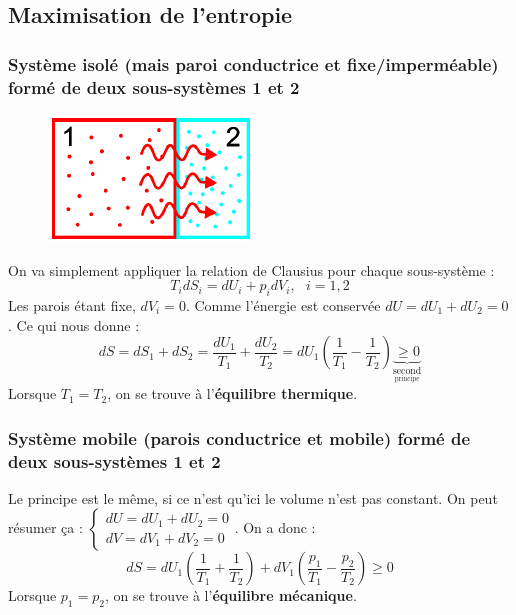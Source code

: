 \documentclass[11pt, a4paper, openany]{book}
\begin{document}
		\subsection{Maximisation de l'entropie}
		\subsubsection{Système isolé (mais paroi conductrice et fixe/imperméable) formé de deux sous-systèmes 1  et 2}
		\begin{figure}
			\includegraphics[scale=0.5]{cp/image3.png}
		\end{figure}
		On va simplement appliquer la relation de Clausius pour chaque sous-système :
		\begin{equation}
			T_idS_i = dU_i + p_idV_i, \ \ \ i= 1,2
		\end{equation}
		Les parois étant fixe, $dV_i = 0$. Comme l'énergie est conservée $dU = dU_1 +dU_2 = 0$. Ce qui nous donne : 
		\begin{equation}
			dS = dS_1+dS_2 = \frac{dU_1}{T_1} + \frac{dU_2}{T_2} = dU_1\left(\frac{1}{T_1} - \frac{1}{T_2}\right) \underbrace{\geq 0}_{\underset{\text{principe}}{\text{second}}}
		\end{equation}
		Lorsque $T_1 = T_2$, on se trouve à l'\textbf{équilibre thermique}.
		
		\subsubsection{Système mobile (parois conductrice et mobile) formé de deux sous-systèmes 1 et 2}
		Le principe est le même, si ce n'est qu'ici le volume n'est pas constant. On peut résumer ça : $\left\{\begin{array}{l}
		dU = dU_1 + dU_2 = 0\\
		dV = dV_1 + dV_2 = 0
		\end{array}\right.$. On a donc :
		\begin{equation}
			dS = dU_1\left(\frac{1}{T_1}+\frac{1}{T_2}\right) + dV_1\left(\frac{p_1}{T_1} - \frac{p_2}{T_2}\right)  \geq 0
		\end{equation}
		Lorsque $p_1 = p_2$, on se trouve à l'\textbf{équilibre mécanique}.
		
\end{document}
